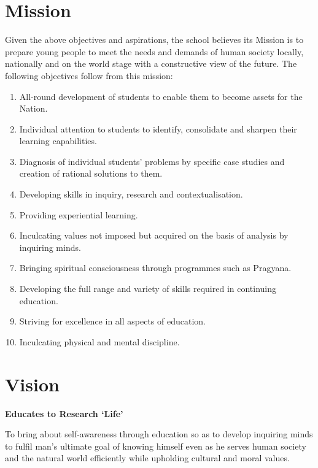   \section{Mission}
 Given the above objectives and aspirations, the school believes its Mission is to prepare young people to meet the needs and demands of human society locally, nationally and on the world stage with a constructive view of the future. The following objectives follow from this mission:
\begin{enumerate}
\item All-round development of students to enable them to become assets for the Nation.
\item Individual attention to students to identify, consolidate and sharpen their learning capabilities.
\item Diagnosis of individual students’ problems by specific case studies and creation of rational solutions to them.
\item Developing skills in inquiry, research and contextualisation.
\item Providing experiential learning.
\item Inculcating values not imposed but acquired on the basis of analysis by inquiring minds.
\item Bringing spiritual consciousness through programmes such as Pragyana.
\item Developing the full range and variety of skills required in continuing education.
\item Striving for excellence in all aspects of education.
\item Inculcating physical and mental discipline.
\end{enumerate}
\section{Vision}
\begin{center}
\textbf{Educates to Research ‘Life’}
\end{center}

To bring about self-awareness through education so as to develop inquiring minds to fulfil man’s ultimate goal of knowing himself even as he serves human society and the natural world efficiently while upholding cultural and moral values.
